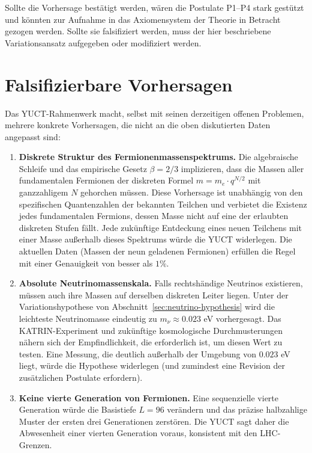 \documentclass[12pt,a4paper]{article}
\begin{document}
	Sollte die Vorhersage bestätigt werden, wären die Postulate P1--P4 stark gestützt und könnten zur Aufnahme in das Axiomensystem der Theorie in Betracht gezogen werden.  Sollte sie falsifiziert werden, muss der hier beschriebene Variationsansatz aufgegeben oder modifiziert werden.
	
	\section{Falsifizierbare Vorhersagen}
	
	Das YUCT-Rahmenwerk macht, selbst mit seinen derzeitigen offenen Problemen, mehrere konkrete Vorhersagen, die nicht an die oben diskutierten Daten angepasst sind:
	
	\begin{enumerate}[label=(\arabic*)]
		\item \textbf{Diskrete Struktur des Fermionenmassenspektrums.}  Die algebraische Schleife und das empirische Gesetz \(\beta = 2/3\) implizieren, dass die Massen aller fundamentalen Fermionen der diskreten Formel \(m = m_e \cdot q^{N/2}\) mit ganzzahligem \(N\) gehorchen müssen.  Diese Vorhersage ist unabhängig von den spezifischen Quantenzahlen der bekannten Teilchen und verbietet die Existenz jedes fundamentalen Fermions, dessen Masse nicht auf eine der erlaubten diskreten Stufen fällt.  Jede zukünftige Entdeckung eines neuen Teilchens mit einer Masse außerhalb dieses Spektrums würde die YUCT widerlegen.  Die aktuellen Daten (Massen der neun geladenen Fermionen) erfüllen die Regel mit einer Genauigkeit von besser als \(1\%\).
		\item \textbf{Absolute Neutrinomassenskala.}  Falls rechtshändige Neutrinos existieren, müssen auch ihre Massen auf derselben diskreten Leiter liegen.  Unter der Variationshypothese von Abschnitt~\ref{sec:neutrino-hypothesis} wird die leichteste Neutrinomasse eindeutig zu \(m_{\nu} \approx 0.023\) eV vorhergesagt.  Das KATRIN-Experiment und zukünftige kosmologische Durchmusterungen nähern sich der Empfindlichkeit, die erforderlich ist, um diesen Wert zu testen.  Eine Messung, die deutlich außerhalb der Umgebung von \(0.023\) eV liegt, würde die Hypothese widerlegen (und zumindest eine Revision der zusätzlichen Postulate erfordern).
		\item \textbf{Keine vierte Generation von Fermionen.}  Eine sequenzielle vierte Generation würde die Basistiefe \(L = 96\) verändern und das präzise halbzahlige Muster der ersten drei Generationen zerstören.  Die YUCT sagt daher die Abwesenheit einer vierten Generation voraus, konsistent mit den LHC-Grenzen.

\end{enumerate}
\end{document}
